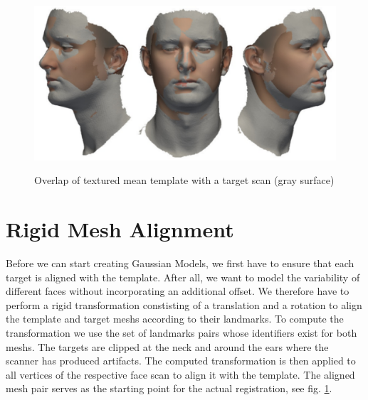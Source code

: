 \begin{figure}[h!]
\centering
\includegraphics[width=.8\textwidth]{./resources/img/overlap_mean_target.pdf}\\
\caption{Overlap of textured mean template with a target scan (gray surface)}
\label{fig:overlap}
\end{figure}

\section{Rigid Mesh Alignment}
Before we can start creating Gaussian Models, we first have to ensure that each target is aligned with the template. After all, we want to model the variability of different faces without incorporating an additional offset. We therefore have to perform a rigid transformation constisting of a translation and a rotation to align the template and target meshs according to their landmarks. To compute the transformation we use the set
of landmarks pairs whose identifiers exist for both meshs. The targets are clipped at the neck and around the ears where the scanner has produced artifacts. The computed transformation is then applied to all vertices of the respective face scan to align it with the template. The aligned mesh pair serves as the starting point for the actual registration, see fig. \ref{fig:overlap}.\newline
\newline

